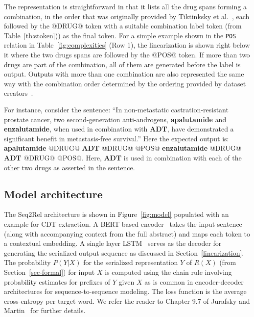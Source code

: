 \documentclass[conference]{IEEEtran}
\begin{document}
The representation is straightforward in that it lists all the drug spans forming a combination, in the order that was originally provided by Tiktinksky et al.~\cite{tiktinsky-etal-2022-dataset}, each followed by the @DRUG@ token with a suitable combination label token (from Table~\ref{tb:stoken})) as the final token. 
For a simple example shown in the \texttt{POS} relation in Table~\ref{fig:complexities} (Row 1), the linearization is shown right below it where the two drugs spans are followed by the @POS@ token. If more than two drugs are part of the combination, all of them are generated before the label is output. Outputs with more than one combination are also represented the same way with the combination order determined by the ordering provided by dataset creators~\cite{tiktinsky-etal-2022-dataset}. 



For instance, consider the sentence: ``In non-metastatic castration-resistant prostate cancer, 
two second-generation anti-androgens, {\textbf{apalutamide} } and {\textbf{enzalutamide}}, when  
used in combination with {\textbf{ADT}}, have demonstrated a significant benefit in 
metastasis-free survival.'' Here the expected output is: {\textbf{apalutamide}} @DRUG@ {\textbf{ADT}} @DRUG@  @POS@ {\textbf{enzalutamide}} @DRUG@ 
{\textbf{ADT}} @DRUG@  @POS@. Here, \textbf{ADT} is used in combination with each of the other two drugs as asserted in the sentence. 



\subsection{Model architecture}
The Seq2Rel architecture is shown in  Figure~\ref{fig:model} populated with an example for CDT extraction. A BERT based encoder~\cite{devlin-etal-2019-bert} takes the input sentence (along with accompanying context from the full abstract) and maps each token to a contextual embedding. A single layer LSTM~\cite{HochSchm97} serves as the decoder for generating the serialized output sequence as discussed in Section~\ref{linearization}. The probability $P(Y|X)$ for the serialized representation $Y$ of $R(X)$ (from Section~\ref{sec-formal}) for input $X$ is computed using the chain rule involving probability estimates for prefixes of $Y$ given $X$ as is common in encoder-decoder architectures for sequence-to-sequence modeling. The loss function is the average cross-entropy per target word. We refer the reader to Chapter 9.7 of Jurafsky and Martin~\cite{slpbook3} for further details.
\end{document}
